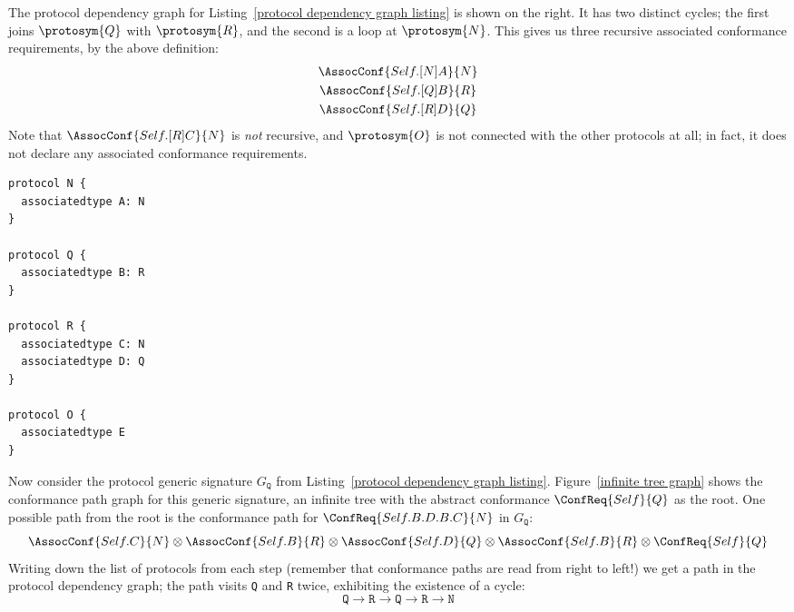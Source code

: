 \documentclass[../generics]{subfiles}
\begin{document}
\smallskip

\begin{wrapfigure}[11]{l}{4.5cm}
\end{wrapfigure}
The protocol dependency graph for Listing~\ref{protocol dependency graph listing} is shown on the right. It has two distinct cycles; the first joins $\protosym{Q}$ with $\protosym{R}$, and the second is a loop at $\protosym{N}$. This gives us three recursive associated conformance requirements, by the above definition:
\begin{gather*}
\AssocConf{Self.[N]A}{N}\\
\AssocConf{Self.[Q]B}{R}\\
\AssocConf{Self.[R]D}{Q}
\end{gather*}
Note that $\AssocConf{Self.[R]C}{N}$ is \emph{not} recursive, and $\protosym{O}$ is not connected with the other protocols at all; in fact, it does not declare any associated conformance requirements.

\smallskip

\begin{listing}\label{protocol dependency graph listing}
\begin{Verbatim}
protocol N {
  associatedtype A: N
}

protocol Q {
  associatedtype B: R
}

protocol R {
  associatedtype C: N
  associatedtype D: Q
}

protocol O {
  associatedtype E
}
\end{Verbatim}
\end{listing}

Now consider the protocol generic signature $G_\texttt{Q}$ from Listing~\ref{protocol dependency graph listing}. Figure~\ref{infinite tree graph} shows the conformance path graph for this generic signature, an infinite tree with the abstract conformance $\ConfReq{Self}{Q}$ as the root. One possible path from the root is the conformance path for $\ConfReq{Self.B.D.B.C}{N}$ in $G_\texttt{Q}$:
\[
\AssocConf{Self.C}{N} \otimes \AssocConf{Self.B}{R} \otimes \AssocConf{Self.D}{Q} \otimes \AssocConf{Self.B}{R} \otimes \ConfReq{Self}{Q}
\]
Writing down the list of protocols from each step (remember that conformance paths are read from right to left!) we get a path in the protocol dependency graph; the path visits \texttt{Q} and \texttt{R} twice, exhibiting the existence of a cycle:
\[\texttt{Q}\longrightarrow\texttt{R}\longrightarrow\texttt{Q}\longrightarrow\texttt{R}\longrightarrow\texttt{N}\]
\end{document}
